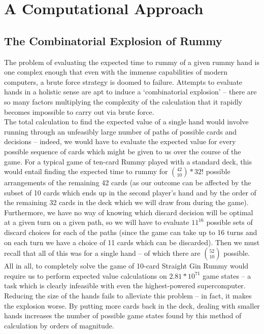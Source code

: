 \documentclass[letter,12pt]{article}
\begin{document}
\section{A Computational Approach}

\subsection{The Combinatorial Explosion of Rummy}

The problem of evaluating the expected time to rummy of a given rummy hand is one complex enough that even with the immense capabilities of modern computers, a brute force strategy is doomed to failure. Attempts to evaluate hands in a holistic sense are apt to induce a ‘combinatorial explosion’ – there are so many factors multiplying the complexity of the calculation that it rapidly becomes impossible to carry out via brute force.\\

The total calculation to find the expected value of a single hand would involve running through an unfeasibly large number of paths of possible cards and decisions – indeed, we would have to evaluate the expected value for every possible sequence of cards which might be given to us over the course of the game. For a typical game of ten-card Rummy played with a standard deck, this would entail finding the expected time to rummy for $\binom{42}{10}*32!$ possible arrangements of the remaining 42 cards (as our outcome can be affected by the subset of 10 cards which ends up in the second player’s hand and by the order of the remaining 32 cards in the deck which we will draw from during the game). Furthermore, we have no way of knowing which discard decision will be optimal at a given turn on a given path, so we will have to evaluate $11^{16}$ possible sets of discard choices for each of the paths (since the game can take up to 16 turns and on each turn we have a choice of 11 cards which can be discarded). Then we must recall that all of this was for a single hand – of which there are $\binom{52}{10}$ possible. All in all, to completely solve the game of 10-card Straight Gin Rummy would require us to perform expected value calculations on $2.81*10^{71}$ game states – a task which is clearly infeasible with even the highest-powered supercomputer.\\

Reducing the size of the hands fails to alleviate this problem – in fact, it makes the explosion worse. By putting more cards back in the deck, dealing with smaller hands increases the number of possible game states found by this method of calculation by orders of magnitude. 
\end{document}
